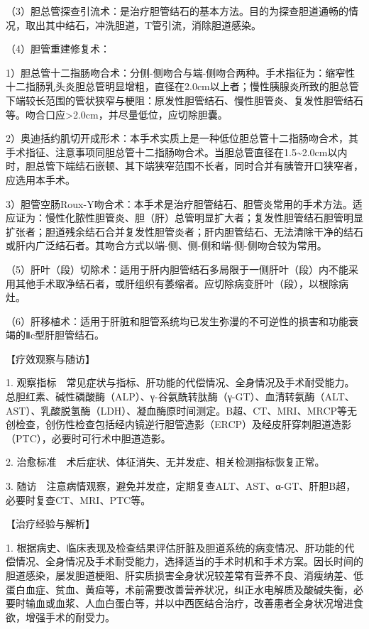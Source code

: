 （3）胆总管探查引流术：是治疗胆管结石的基本方法。目的为探查胆道通畅的情况，取出其中结石，冲洗胆道，T管引流，消除胆道感染。

（4）胆管重建修复术：

1）胆总管十二指肠吻合术：分侧-侧吻合与端-侧吻合两种。手术指征为：缩窄性十二指肠乳头炎胆总管明显增粗，直径在2.0cm以上者；慢性胰腺炎所致的胆总管下端较长范围的管状狭窄与梗阻：原发性胆管结石、慢性胆管炎、复发性胆管结石等。吻合口应\textgreater{}2.0cm，并尽量低位，应切除胆囊。

2）奥迪括约肌切开成形术：本手术实质上是一种低位胆总管十二指肠吻合术，其手术指征、注意事项同胆总管十二指肠吻合术。当胆总管直径在1.5\textasciitilde{}2.0cm以内时，胆总管下端结石嵌顿、其下端狭窄范围不长者，同时合并有胰管开口狭窄者，应选用本手术。

3）胆管空肠Roux-Y吻合术：本手术是治疗胆管结石、胆管炎常用的手术方法。适应证为：慢性化脓性胆管炎、胆（肝）总管明显扩大者；复发性胆管结石胆管明显扩张者；胆道残余结石合并复发性胆管炎者；肝内胆管结石、无法清除干净的结石或肝内广泛结石者。其吻合方式以端-侧、侧-侧和端-侧-侧吻合较为常用。

（5）肝叶（段）切除术：适用于肝内胆管结石多局限于一侧肝叶（段）内不能采用其他手术取净结石者，或肝组织有萎缩者。应切除病变肝叶（段），以根除病灶。

（6）肝移植术：适用于肝脏和胆管系统均已发生弥漫的不可逆性的损害和功能衰竭的Ⅱc型肝胆管结石。

【疗效观察与随访】

1.
观察指标　常见症状与指标、肝功能的代偿情况、全身情况及手术耐受能力。总胆红素、碱性磷酸酶（ALP）、γ-谷氨酰转肽酶（γ-GT）、血清转氨酶（ALT、AST）、乳酸脱氢酶（LDH）、凝血酶原时间测定。B超、CT、MRI、MRCP等无创检查，创伤性检查包括经内镜逆行胆管造影（ERCP）及经皮肝穿刺胆道造影（PTC），必要时可行术中胆道造影。

2. 治愈标准　术后症状、体征消失、无并发症、相关检测指标恢复正常。

3.
随访　注意病情观察，避免并发症，定期复查ALT、AST、α-GT、肝胆B超，必要时复查CT、MRI、PTC等。

【治疗经验与解析】

1.
根据病史、临床表现及检查结果评估肝脏及胆道系统的病变情况、肝功能的代偿情况、全身情况及手术耐受能力，选择适当的手术时机和手术方案。因长时间的胆道感染，屡发胆道梗阻、肝实质损害全身状况较差常有营养不良、消瘦纳差、低蛋白血症、贫血、黄疸等，术前需要改善营养状况，纠正水电解质及酸碱失衡，必要时输血或血浆、人血白蛋白等，并以中西医结合治疗，改善患者全身状况增进食欲，增强手术的耐受力。


